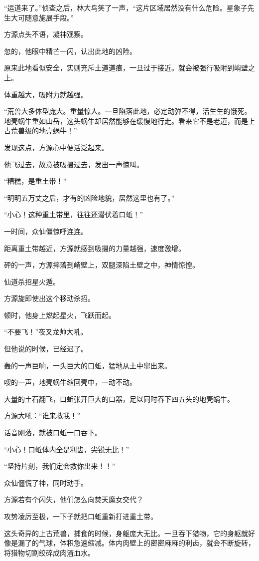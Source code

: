 \begin{this_body}
“运道来了。”侦查之后，林大鸟笑了一声，“这片区域居然没有什么危险。星象子先生大可随意施展手段。”

方源点头不语，凝神观察。

忽的，他眼中精芒一闪，认出此地的凶险。

原来此地看似安全，实则充斥土道道痕，一旦过于接近。就会被强行吸附到峭壁之上。

体重越大，吸附力就越强。

“荒兽大多体型庞大。重量惊人。一旦陷落此地，必定动弹不得，活生生的饿死。地壳蜗牛重如山岳，这头蜗牛却居然能够在缓慢地行走。看来它不是老迈，而是上古荒兽级的地壳蜗牛！”

发现这点，方源心中便活泛起来。

他飞过去，故意被吸摄过去，发出一声惊叫。

“糟糕，是重土带！”

“明明五万丈之后，才有的凶险地貌，居然这里也有了。”

“小心！这种重土带里，往往还潜伏着口蚯！”

一时间，众仙僵惊呼连连。

距离重土带越近，方源就感到吸摄的力量越强，速度激增。

砰的一声，方源摔落到峭壁上，双腿深陷土壁之中，神情惊惶。

仙道杀招星火遁。

方源旋即使出这个移动杀招。

顿时，他身上燃起星火，飞跃而起。

“不要飞！”夜叉龙帅大吼。

但他说的时候，已经迟了。

轰的一声巨响，一头巨大的口蚯，猛地从土中窜出来。

嗖的一声，地壳蜗牛缩回壳中，一动不动。

大量的土石翻飞，口蚯张开巨大的口器，足以同时吞下四五头的地壳蜗牛。

方源大吼：“谁来救我！”

话音刚落，就被口蚯一口吞下。

“小心！口蚯体内全是利齿，尖锐无比！”

“坚持片刻，我们定会救你出来！！”

众仙僵慌了神，同时动手。

方源若有个闪失，他们怎么向焚天魔女交代？

攻势凌厉至极，一下子就把口蚯重新打进重土带。

这头奇异的上古荒兽，捕食的时候，身躯庞大无比。一旦吞下猎物，它的身躯就好像是漏了的气球，体积急速缩减。体内肉壁上的密密麻麻的利齿，就会不断旋转，将猎物切割绞碎成肉渣血水。


\end{this_body}
